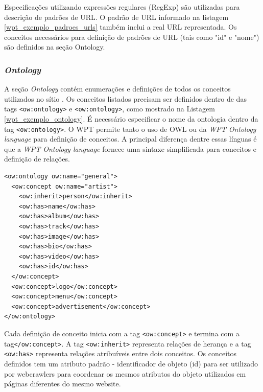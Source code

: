 Especificações utilizando expressões regulares (RegExp) são utilizadas para descrição de padrões de URL. O padrão de URL informado na listagem \ref{wpt_exemplo_padroes_urls} também inclui a real URL representada. Os conceitos necessários para definição de padrões de URL (tais como "id" e "nome") são definidos na seção Ontology.

\subsubsection{\textit{Ontology}}

A seção \textit{Ontology} contém enumerações e definições de todos os conceitos utilizados no sítio \cite{wpt}. Os conceitos listados precisam ser definidos dentro de das tags \texttt{<ow:ontology>} e \texttt{<ow:ontology>}, como mostrado na Listagem \ref{wpt_exemplo_ontology}. É necessário especificar o nome da ontologia dentro da tag \texttt{<ow:ontology>}. O WPT permite tanto o uso de OWL ou da \emph{WPT Ontology language} para definição de conceitos. A principal diferença dentre essas línguas é que a \emph{WPT Ontology language} fornece uma sintaxe simplificada para conceitos e definição de relações.

\begin{lstlisting}[label=wpt_exemplo_ontology]
<ow:ontology ow:name="general">
  <ow:concept ow:name="artist">
    <ow:inherit>person</ow:inherit>
    <ow:has>name</ow:has>
    <ow:has>album</ow:has>
    <ow:has>track</ow:has>
    <ow:has>image</ow:has>
    <ow:has>bio</ow:has>
    <ow:has>video</ow:has>
    <ow:has>id</ow:has>
  </ow:concept>
  <ow:concept>logo</ow:concept>
  <ow:concept>menu</ow:concept>
  <ow:concept>advertisement</ow:concept>
</ow:ontology>
\end{lstlisting}

Cada definição de conceito inicia com a tag \texttt{<ow:concept>} e termina com a tag\texttt{</ow:concept>}. A tag \texttt{<ow:inherit>} representa relações de herança e a tag \texttt{<ow:has>} representa relações atribuíveis entre dois conceitos. Os conceitos definidos tem um atributo padrão - identificador de objeto (id) para ser utilizado por \glspl{webcrawler} para coordenar os mesmos atributos do objeto utilizados em páginas diferentes do mesmo website.
